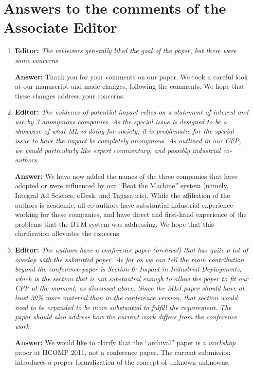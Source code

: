 \documentclass[letterpaper]{article}
\begin{document}
\section{Answers to the comments of the Associate Editor}



\begin{enumerate}

\item \textbf{Editor:} \emph{The reviewers generally liked the goal of the paper, but there were some concerns}

\textbf{Answer:} Thank you for your comments on our paper. We took a careful look at our manuscript and made changes, following the comments. We hope that these changes address your concerns.

\item \textbf{Editor:}  \emph{The evidence of potential impact relies on a statement of interest and use by 3 anonymous companies. As the special issue is designed to be a showcase of what ML is doing for society, it is problematic for the special issue to have the impact be completely anonymous. As outlined in our CFP, we would particularly like expert commentary, and possibly industrial co-authors.}

\textbf{Answer:} We have now added the names of the three companies that have adopted or were influenced by our ``Beat the Machine'' system (namely, Integral Ad Science, oDesk, and Tagasauris). While the affiliation of the authors is academic, all co-authors have substantial industrial experience working for these companies, and have direct and first-hand experience of the problems that the BTM system was addressing. We hope that this clarification alleviates the concerns.

\item \textbf{Editor:}  \emph{The authors have a conference paper (archival) that has quite a lot of overlap with the submitted paper. As far as we can tell the main contribution beyond the conference paper is Section 6: Impact in Industrial Deployments, which is the section that is not substantial enough to allow the paper to fit our CFP at the moment, as discussed above. Since the MLJ paper should have at least 30\% more material than in the conference version, that section would need to be expanded to be more substantial to fulfill the requirement. The paper should also address how the current work differs from the conference work. }

\textbf{Answer:} We would like to clarify that the ``archival'' paper is a \emph{workshop} paper at HCOMP 2011, not a conference paper. The current submission introduces a proper formalization of the concept of unknown unknowns, 


\end{enumerate}
\end{document}
